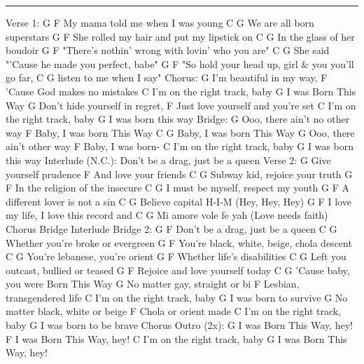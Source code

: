 \noindent\rule{\columnwidth}{1pt}

\begin{multicols}{2}
\begin{lstsong}
Verse 1:
G                    F
My mama told me when I was young
C                    G 
We are all born superstars
G                      F
She rolled my hair and put my lipstick on
C                      G 
In the glass of her boudoir
G                            F
"There's nothin' wrong with lovin' who you are"
C           G 
She said "'Cause he made you perfect, babe"
G                      F
"So hold your head up, girl & you you'll go far,
C                    G 
listen to me when I say"
Chorus:
    G 
I'm beautiful in my way,
       F
'Cause God makes no mistakes
           C
I'm on the right track, baby
      G 
I was Born This Way
           G 
Don't hide yourself in regret,
          F
Just love yourself and you're set
           C
I'm on the right track, baby
      G 
I was born this way
Bridge:
G 
Ooo, there ain't no other way
F
Baby, I was born This Way
C          G 
Baby, I was born This Way
G 
Ooo, there ain't other way
F
Baby, I was born-
           C
I'm on the right track, baby
      G 
I was born this way
Interlude (N.C.): Don't be a drag, just be a queen
Verse 2:
G 
Give yourself prudence
F
And love your friends
C                        G 
Subway kid, rejoice your truth
G                      F
In the religion of the insecure
          C                  G 
I must be myself, respect my youth
G                    F
A different lover is not a sin
C                  G 
Believe capital H-I-M (Hey, Hey, Hey)
G                  F
I love my life, I love this record and
C                G 
Mi amore vole fe yah (Love needs faith)
Chorus
Bridge
Interlude
Bridge 2:
      G               F
Don't be a drag, just be a queen
   C                    G 
Whether you're broke or evergreen
       G                    F
You're black, white, beige, chola descent
       C                  G 
You're lebanese, you're orient
G                  F
Whether life's disabilities
      C           G 
Left you outcast, bullied or teased
G                F
Rejoice and love yourself today
C                     G 
'Cause baby, you were Born This Way
          G 
No matter gay, straight or bi
         F
Lesbian, transgendered life
           C
I'm on the right track, baby
      G 
I was born to survive
          G 
No matter black, white or beige
         F
Chola or orient made
           C
I'm on the right track, baby
      G 
I was born to be brave
Chorus
Outro (2x):
      G 
I was Born This Way, hey!
      F
I was Born This Way, hey!
           C
I'm on the right track, baby
      G 
I was Born This Way, hey!
\end{lstsong}
\end{multicols}
\newpage

